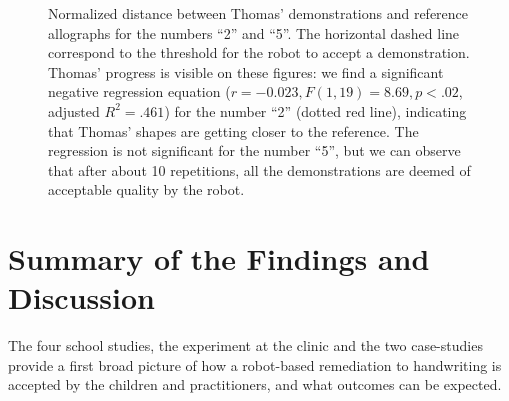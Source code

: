 \documentclass{article}
\begin{document}
\begin{figure}
    \centering
    \caption{\small Normalized distance between Thomas' demonstrations and
        reference allographs for the numbers ``2'' and ``5''. The horizontal
        dashed line correspond to the threshold for the robot to accept a
        demonstration. Thomas' progress is visible on these figures: we find a
        significant negative regression equation ($r=-0.023, F(1,19)=8.69,
        p<.02$, adjusted $R^2=.461$) for the number ``2'' (dotted red line),
        indicating that Thomas' shapes are getting closer to the reference. The
        regression is not significant for the number ``5'', but we can observe
        that after about 10 repetitions, all the demonstrations are deemed of
        acceptable quality by the robot.  }

    \label{Thomas_progress}
\end{figure}

\section{Summary of the Findings and Discussion}

The four school studies, the experiment at the clinic and the two case-studies
provide a first broad picture of how a robot-based remediation to handwriting is
accepted by the children and practitioners, and what outcomes can be expected.
\end{document}
